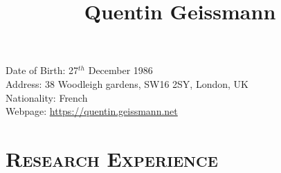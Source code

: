 \documentclass[109pt]{article}
\title{\bfseries\Huge Quentin Geissmann}
\author{\href{mailto:\sendTo}{\mymail}}
\date{}
\begin{document}
\maketitle

\begin{minipage}[ht]{0.48\textwidth}
Date of Birth: 27$^{th}$ December 1986\\
Address: 38 Woodleigh gardens, SW16 2SY, London, UK\\
Nationality: French\\
Webpage: \href{https://quentin.geissmann.net}{https://quentin.geissmann.net}
\end{minipage}
\vspace{1pt}
\section*{\textsc{Research Experience}}
\end{document}
